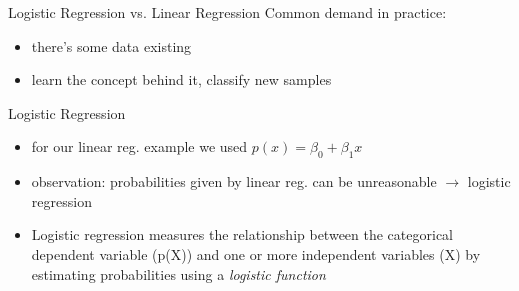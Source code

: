 \documentclass{beamer}
\begin{document}
\begin{frame}{Logistic Regression vs. Linear Regression}
Common demand in practice:
\begin{itemize}
\item there's some data existing
\item learn the concept behind it, classify new samples
\end{itemize}
\end{frame}


\begin{frame}{Logistic Regression}
\begin{itemize}
\item for our linear reg. example we used $p(x) = \beta_0 + \beta_1x$
\item observation: probabilities given by linear reg. can be unreasonable $\rightarrow$ logistic regression
\item Logistic regression measures the relationship between the categorical dependent variable (p(X)) and one or more independent variables (X) by estimating probabilities using a \emph{logistic function}
\end{itemize}
\end{frame}
\end{document}
